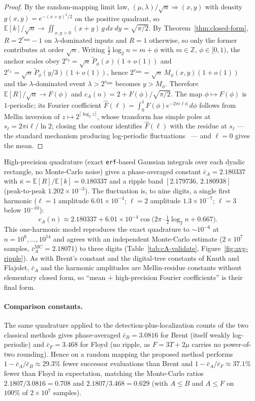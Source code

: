 \documentclass[11pt]{article}
\begin{document}
\begin{proof}
By the random-mapping limit law, $(\mu,\lambda)/\sqrt n\Rightarrow(x,y)$ with
density $g(x,y)=e^{-(x+y)^2/2}$ on the positive quadrant, so
$\mathbb E[k]/\sqrt n\to\iint_{x,y>0}(x+y)\,g\,dx\,dy=\sqrt{\pi/2}$. By
Theorem~\ref{thm:closed-form}, $R=2^{r_{\min}}-1$ on $\lambda$-dominated inputs and
$R=1$ otherwise, so only the former contributes at order $\sqrt n$. Writing
$\tfrac12\log_2 n=m+\phi$ with $m\in\mathbb Z$, $\phi\in[0,1)$, the anchor scales
obey $2^{r_0}=\sqrt n\,\tilde P_\phi(x)(1+o(1))$ and
$2^{r_\lambda}=\sqrt n\,\tilde P_\phi(y/3)(1+o(1))$, hence
$2^{r_{\min}}=\sqrt n\,M_\phi(x,y)(1+o(1))$ and the $\lambda$-dominated event
$\lambda>2^{r_{\min}}$ becomes $y>M_\phi$. Therefore
$\mathbb E[R]/\sqrt n\to F(\phi)$ and $c_A(n)=2+F(\phi)/\sqrt{\pi/2}$. The map
$\phi\mapsto F(\phi)$ is $1$-periodic; its Fourier coefficient
$\hat F(\ell)=\int_0^1 F(\phi)e^{-2\pi i\ell\phi}\,d\phi$ follows from Mellin
inversion of $z\mapsto2^{\lceil\log_2 z\rceil}$, whose transform has simple poles
at $s_\ell=2\pi i\ell/\ln2$; closing the contour identifies $\hat F(\ell)$ with the
residue at $s_\ell$ --- the standard mechanism producing log-periodic
fluctuations~\cite{flajolet,sedgewick2013} --- and $\ell=0$ gives the mean.
\end{proof}

High-precision quadrature (exact \texttt{erf}-based Gaussian integrals over each
dyadic rectangle, no Monte-Carlo noise) gives a phase-averaged constant
$\bar c_A=2.180337$ with $\bar\kappa=\mathbb E[R]/\mathbb E[k]=0.180337$ and a
ripple band $[2.179736,\,2.180938]$ (peak-to-peak $1.202\times10^{-3}$). The
fluctuation is, to nine digits, a single first harmonic ($\ell{=}1$ amplitude
$6.01\times10^{-4}$; $\ell{=}2$ amplitude $1.3\times10^{-7}$; $\ell{=}3$ below
$10^{-10}$):
\[
\boxed{\;c_A(n)\approx 2.180337+6.01\times10^{-4}\cos\!\big(2\pi\cdot\tfrac12\log_2 n+0.667\big).\;}
\]
This one-harmonic model reproduces the exact quadrature to $\sim10^{-6}$ at
$n=10^6,\dots,10^{14}$ and agrees with an independent Monte-Carlo estimate
($2\times10^7$ samples, $\bar c_A^{\mathrm{MC}}=2.18071$) to three digits
(Table~\ref{tab:cA-validate}, Figure~\ref{fig:avg-ripple}). As with Brent's
constant and the digital-tree constants of Knuth and Flajolet, $\bar c_A$ and the
harmonic amplitudes are Mellin-residue constants without elementary closed form,
so ``mean $+$ high-precision Fourier coefficients'' is their final form.

\paragraph{Comparison constants.}
The same quadrature applied to the detection-plus-localization counts of the two
classical methods gives phase-averaged $\bar c_B=3.0816$ for Brent (itself weakly
log-periodic) and $\bar c_F=3.468$ for Floyd (no ripple, as $F=3T+2\mu$ carries no
power-of-two rounding). Hence on a random mapping the proposed method performs
$1-\bar c_A/\bar c_B\approx29.3\%$ fewer successor evaluations than Brent and
$1-\bar c_A/\bar c_F\approx37.1\%$ fewer than Floyd in expectation, matching the
Monte-Carlo ratios $2.1807/3.0816=0.708$ and $2.1807/3.468=0.629$ (with $A\le B$
and $A\le F$ on $100\%$ of $2\times10^7$ samples).
\end{document}

